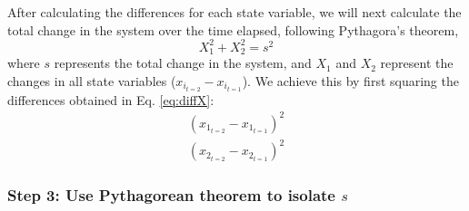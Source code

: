 \documentclass[12pt,twoside,openany]{reedthesis}
\begin{document}
After calculating the differences for each state variable, we will next calculate the total change in the system over the time elapsed, following Pythagora's theorem,
\begin{equation}
 X_1^2 + X_2^2 = s^2 
  \label{eq:pythagorean}
\end{equation}
where \(s\) represents the total change in the system, and \(X_1\) and \(X_2\) represent the changes in all state variables (\(x_{i_{t=2}} - x_{i_{t=1}}\)). We achieve this by first squaring the differences obtained in Eq. \eqref{eq:diffX}:
\begin{equation}
\begin{array}{rcr}
(x_{1_{t=2}} - x_{1_{t=1}})^2  \\
(x_{2_{t=2}} - x_{2_{t=1}})^2 
\end{array}
  \label{eq:diffXsq}
\end{equation}
\hypertarget{step-3-use-pythagorean-theorem-to-isolate-s}{%
\subsubsection{\texorpdfstring{Step 3: Use Pythagorean theorem to isolate \(s\)}{Step 3: Use Pythagorean theorem to isolate s}}\label{step-3-use-pythagorean-theorem-to-isolate-s}}
\end{document}
